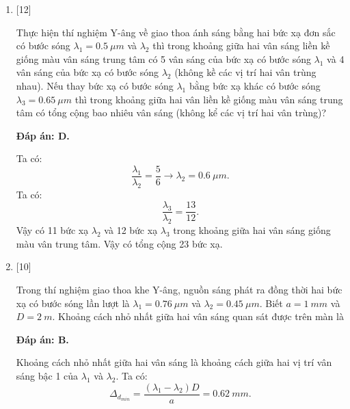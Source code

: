 \begin{enumerate}[label=\bfseries Câu \arabic*:]
	\item {} [12]
	\cauhoi
	{Thực hiện thí nghiệm Y-âng về giao thoa ánh sáng bằng hai bức xạ đơn sắc có bước sóng $\lambda_{1}= \SI{0,5}{\mu m}$ và $\lambda_{2}$ thì trong khoảng giữa hai vân sáng liền kề giống màu vân sáng trung tâm có 5 vân sáng của bức xạ có bước sóng $\lambda_{1}$ và 4 vân sáng của bức xạ có bước sóng $\lambda_{2}$ (không kề các vị trí hai vân trùng nhau). Nếu thay bức xạ có bước sóng $\lambda_{1}$ bằng bức xạ khác có bước sóng $\lambda_{3} = \SI{0,65}{\mu m}$ thì trong khoảng giữa hai vân liền kề giống màu vân sáng trung tâm có tổng cộng bao nhiêu vân sáng (không kể các vị trí hai vân trùng)?
	}
	
	\loigiai
	{		\textbf{Đáp án: D.}
		
		Ta có:
		$$
		\dfrac{\lambda_{1}}{\lambda_{2}} = \dfrac{5}{6} \rightarrow \lambda_{2} = \SI{0,6}{\mu m}.
		$$
		Ta có:
		$$
		\dfrac{\lambda_{3}}{\lambda_{2}} = \dfrac{13}{12}.
		$$
		Vậy có 11 bức xạ $\lambda_{2}$ và 12 bức xạ $\lambda_{3}$ trong khoảng giữa hai vân sáng giống màu vân trung tâm. Vậy có tổng cộng 23 bức xạ.
	}
	
	\item {} [10]
	\cauhoi
	{Trong thí nghiệm giao thoa khe Y-âng, nguồn sáng phát ra đồng thời hai bức xạ có bước sóng lần lượt là $\lambda_{1} = \SI{0,76}{\mu m}$ và $\lambda_{2} = \SI{0,45}{\mu m}$. Biết $a = \SI{1}{mm}$ và $D = \SI{2}{m}$. Khoảng cách nhỏ nhất giữa hai vân sáng quan sát được trên màn là
	}
	
	\loigiai
	{		\textbf{Đáp án: B.}
		
		Khoảng cách nhỏ nhất giữa hai vân sáng là khoảng cách giữa hai vị trí vân sáng bậc 1 của $\lambda_{1}$ và $\lambda_{2}$. Ta có:
		$$
		\Delta_{d_{min}} = \dfrac{(\lambda_{1}-\lambda_{2})D}{a} = \SI{0,62}{mm}.
		$$
	}
	

\end{enumerate}
